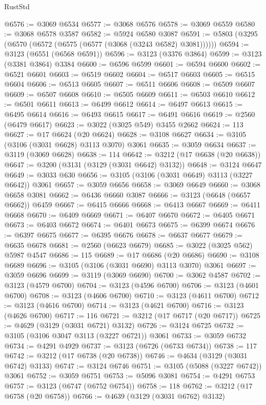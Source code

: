 \begin{lexlean}{RustStd}
\begin{coremodule}
@6576 := @3069 @6534
@6577 := @3068 @6576
@6578 := @3069 @6559
@6580 := @3068 @6578 @3587
@6582 := @5924 @6580 @3087
@6591 := @5803 (@3295 (@6570 (@6572 (@6575 (@6577 (@3068 (@3243 @6582) @3081))))))
@6594 := @3123 (@6551 (@6568 @6591))
@6596 := @3123 (@3376 @3864)
@6599 := @3123 (@3381 @3864) @3384
@6600 := @6596 @6599
@6601 := @6594 @6600
@6602 := @6521 @6601
@6603 := @6519 @6602
@6604 := @6517 @6603
@6605 := @6515 @6604
@6606 := @6513 @6605
@6607 := @6511 @6606
@6608 := @6509 @6607
@6609 := @6507 @6608
@6610 := @6505 @6609
@6611 := @6503 @6610
@6612 := @6501 @6611
@6613 := @6499 @6612
@6614 := @6497 @6613
@6615 := @6495 @6614
@6616 := @6493 @6615
@6617 := @6491 @6616
@6619 := @2560 (@6479 @6617)
@6623 := @3022 (@3025 @549) @3455 @2662
@6624 := 113
@6627 := @17 @6624 (@20 @6624)
@6628 := @3108 @6627
@6634 := @3105 (@3106 (@3031 @6628) @3113 @3070) @3061
@6635 := @3059 @6634
@6637 := @3119 (@3069 @6628)
@6638 := 114
@6642 := @3212 (@17 @6638 (@20 @6638))
@6647 := @3200 (@3131 (@3129 (@3031 @6642) @3132))
@6648 := @3124 @6647
@6649 := @3033 @630
@6656 := @3105 (@3106 (@3031 @6649) @3113 (@3227 @6642)) @3061
@6657 := @3059 @6656
@6658 := @3069 @6649
@6660 := @3068 @6658 @3081
@6662 := @6436 @6660 @3087
@6666 := @3123 (@6648 (@6657 @6662)) @6459
@6667 := @6415 @6666
@6668 := @6413 @6667
@6669 := @6411 @6668
@6670 := @6409 @6669
@6671 := @6407 @6670
@6672 := @6405 @6671
@6673 := @6403 @6672
@6674 := @6401 @6673
@6675 := @6399 @6674
@6676 := @6397 @6675
@6677 := @6395 @6676
@6678 := @6637 @6677
@6679 := @6635 @6678
@6681 := @2560 (@6623 @6679)
@6685 := @3022 (@3025 @562) @5987 @4547
@6686 := 115
@6689 := @17 @6686 (@20 @6686)
@6690 := @3108 @6689
@6696 := @3105 (@3106 (@3031 @6690) @3113 @3070) @3061
@6697 := @3059 @6696
@6699 := @3119 (@3069 @6690)
@6700 := @3062 @4587
@6702 := @3123 (@4579 @6700)
@6704 := @3123 (@4596 @6700)
@6706 := @3123 (@4601 @6700)
@6708 := @3123 (@4606 @6700)
@6710 := @3123 (@4611 @6700)
@6712 := @3123 (@4616 @6700)
@6714 := @3123 (@4621 @6700)
@6716 := @3123 (@4626 @6700)
@6717 := 116
@6721 := @3212 (@17 @6717 (@20 @6717))
@6725 := @4629 (@3129 (@3031 @6721) @3132)
@6726 := @3124 @6725
@6732 := @3105 (@3106 @3047 @3113 (@3227 @6721)) @3061
@6733 := @3059 @6732
@6734 := @4291 @4929
@6737 := @3123 (@6726 (@6733 @6734))
@6738 := 117
@6742 := @3212 (@17 @6738 (@20 @6738))
@6746 := @4634 (@3129 (@3031 @6742) @3133)
@6747 := @3124 @6746
@6751 := @3105 (@5088 (@3227 @6742)) @3061
@6752 := @3059 @6751
@6753 := @5096 @3081
@6754 := @4291 @6753
@6757 := @3123 (@6747 (@6752 @6754))
@6758 := 118
@6762 := @3212 (@17 @6758 (@20 @6758))
@6766 := @4639 (@3129 (@3031 @6762) @3132)

\end{coremodule}
\end{lexlean}
